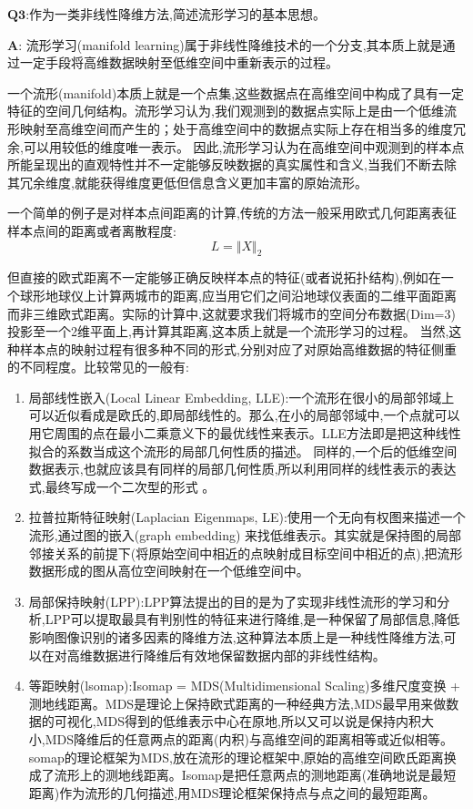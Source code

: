\documentclass[homework]{IEEEtran}
\begin{document}
\begin{CJK}{UTF8}{gkai}
$\mathbf{Q3}$:作为一类非线性降维方法,简述流形学习的基本思想。\par
$\mathbf{A}$: 流形学习(manifold learning)属于非线性降维技术的一个分支,其本质上就是通过一定手段将高维数据映射至低维空间中重新表示的过程。 \par
一个流形(manifold)本质上就是一个点集,这些数据点在高维空间中构成了具有一定特征的空间几何结构。流形学习认为,我们观测到的数据点实际上是由一个低维流形映射至高维空间而产生的；处于高维空间中的数据点实际上存在相当多的维度冗余,可以用较低的维度唯一表示。
因此,流形学习认为在高维空间中观测到的样本点所能呈现出的直观特性并不一定能够反映数据的真实属性和含义,当我们不断去除其冗余维度,就能获得维度更低但信息含义更加丰富的原始流形。 \par
一个简单的例子是对样本点间距离的计算,传统的方法一般采用欧式几何距离表征样本点间的距离或者离散程度:
$$
L = \Vert X \Vert_2
$$ \par
但直接的欧式距离不一定能够正确反映样本点的特征(或者说拓扑结构),例如在一个球形地球仪上计算两城市的距离,应当用它们之间沿地球仪表面的二维平面距离而非三维欧式距离。实际的计算中,这就要求我们将城市的空间分布数据(Dim=3)投影至一个2维平面上,再计算其距离,这本质上就是一个流形学习的过程。
当然,这种样本点的映射过程有很多种不同的形式,分别对应了对原始高维数据的特征侧重的不同程度。比较常见的一般有:
\begin{enumerate}
\item 局部线性嵌入(Local Linear Embedding, LLE):一个流形在很小的局部邻域上可以近似看成是欧氏的,即局部线性的。那么,在小的局部邻域中,一个点就可以用它周围的点在最小二乘意义下的最优线性来表示。LLE方法即是把这种线性拟合的系数当成这个流形的局部几何性质的描述。
同样的,一个后的低维空间数据表示,也就应该具有同样的局部几何性质,所以利用同样的线性表示的表达式,最终写成一个二次型的形式 。
\item 拉普拉斯特征映射(Laplacian Eigenmaps, LE):使用一个无向有权图来描述一个流形,通过图的嵌入(graph embedding) 来找低维表示。其实就是保持图的局部邻接关系的前提下(将原始空间中相近的点映射成目标空间中相近的点),把流形数据形成的图从高位空间映射在一个低维空间中。
\item 局部保持映射(LPP):LPP算法提出的目的是为了实现非线性流形的学习和分析,LPP可以提取最具有判别性的特征来进行降维,是一种保留了局部信息,降低影响图像识别的诸多因素的降维方法,这种算法本质上是一种线性降维方法,可以在对高维数据进行降维后有效地保留数据内部的非线性结构。
\item 等距映射(lsomap):Isomap = MDS(Multidimensional Scaling)多维尺度变换 + 测地线距离。MDS是理论上保持欧式距离的一种经典方法,MDS最早用来做数据的可视化,MDS得到的低维表示中心在原地,所以又可以说是保持内积大小,MDS降维后的任意两点的距离(内积)与高维空间的距离相等或近似相等。
somap的理论框架为MDS,放在流形的理论框架中,原始的高维空间欧氏距离换成了流形上的测地线距离。Isomap是把任意两点的测地距离(准确地说是最短距离)作为流形的几何描述,用MDS理论框架保持点与点之间的最短距离。
\end{enumerate}


\end{CJK}
\end{document}
